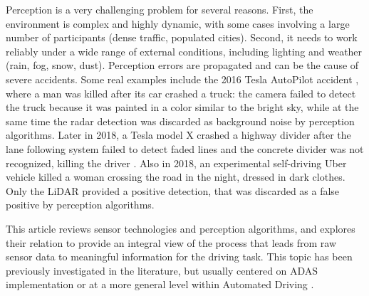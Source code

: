 Perception is a very challenging problem for several
reasons. First, the environment is complex and highly dynamic, with some cases
involving a large number of participants (dense traffic, populated cities). 
Second, it needs to work reliably under a wide range of external conditions, 
including lighting and weather (rain, fog, snow, dust). 
Perception errors are propagated and can be the cause of severe accidents. 
Some real examples include the 2016 Tesla AutoPilot accident \cite{NTSB2017},
where a man was killed after its car crashed a truck: 
the camera failed to detect the truck because
it was painted in a color similar to the bright sky, while at the same time 
the radar detection was discarded as background noise by perception algorithms.
Later in 2018, a Tesla model X crashed a highway divider after the lane
following system failed to detect faded lines and the concrete divider was not
recognized, killing the driver \cite{NTSB2018a}.
Also in 2018, an experimental self-driving Uber vehicle killed a woman
crossing the road \cite{NTSB2018} in the night, dressed in dark clothes. 
Only the LiDAR provided a positive detection, that was discarded as a false
positive by perception algorithms.

This article reviews sensor technologies and perception algorithms, and explores
their relation to provide an integral view of the process that leads from raw
sensor data to meaningful information for the driving task.
This topic has been previously investigated in the literature, but usually
centered on ADAS implementation \cite{Yenkanchi2016,Ziebinski2016a} or at a
more general level within Automated Driving \cite{Pendleton2017}. 


